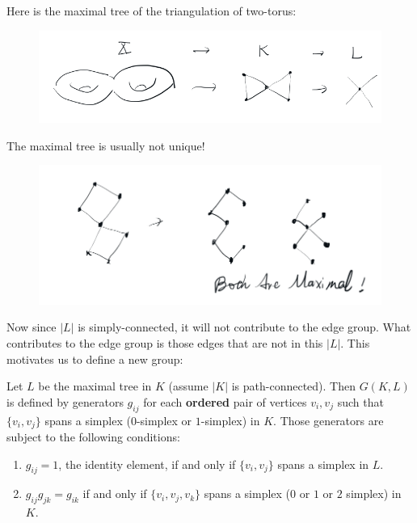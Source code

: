 \begin{ex}
    Here is the maximal tree of the triangulation of two-torus:
    \begin{figure}[H]
        \centering
        \includegraphics[width=0.9\linewidth]{pics/ch6-notes-3/ex1-maximal-tree.png}
    \end{figure}
\end{ex}

\begin{ex}
    The maximal tree is usually not unique!
    \begin{figure}[H]
        \centering
        \includegraphics[width=0.9\linewidth]{pics/ch6-notes-3/ex2-maxi-tree-not-unique.png}
    \end{figure}
\end{ex}


Now since $|L|$ is simply-connected, it will not contribute to the
edge group. What contributes to the edge group is those edges that are
not in this $|L|$. This motivates us to define a new group:

\begin{defi}[$G(K,L)$]
    Let $L$ be the maximal tree in $K$ (assume $|K|$ is
    path-connected). Then $G(K,L)$ is defined by generators $g_{ij}$
    for each \textbf{ordered} pair of vertices $v_i,v_j$ such that
    $\{v_i,v_j\}$ spans a simplex ($0$-simplex or $1$-simplex) in $K$.
    Those generators are subject to the following conditions:
    \begin{enumerate}
        \item $g_{ij}=1$, the identity element, if and only if
            $\{v_i,v_j\}$ spans a simplex in $L$.
        \item $g_{ij}g_{jk}=g_{ik}$ if and only if $\{v_i,v_j,v_k\}$
            spans a simplex ($0$ or $1$ or $2$ simplex) in $K$.
    \end{enumerate}
\end{defi}

